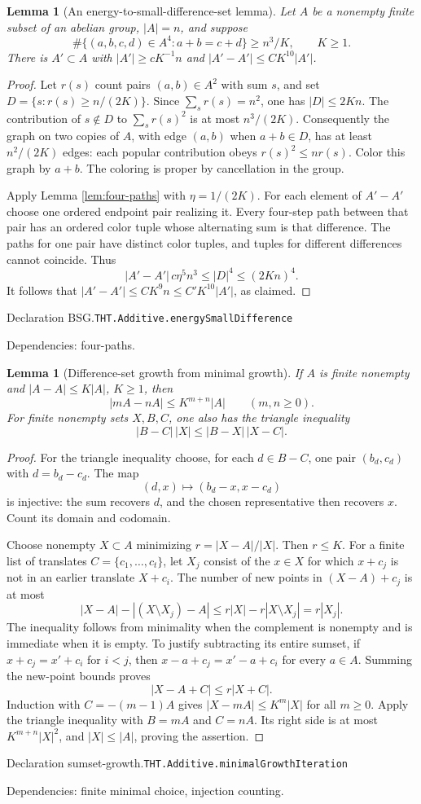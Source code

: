 \documentclass[11pt]{article}
\newtheorem{lemma}[theorem]{Lemma}
\theoremstyle{definition}
\numberwithin{equation}{section}
\newcommand{\bp}[3]{\par\smallskip\begingroup\footnotesize
\noindent\hypertarget{bp:#1}{\textsf{Declaration #1.}}\quad\nolinkurl{#2}\par
\noindent\textsf{Dependencies:} #3.\par\endgroup\smallskip}
\begin{document}
\begin{lemma}[An energy-to-small-difference-set lemma]\label{lem:BSG}
Let $A$ be a nonempty finite subset of an abelian group, $|A|=n$, and suppose
\[
 \#\{(a,b,c,d)\in A^4:a+b=c+d\}\ge n^3/K,\qquad K\ge1.
\]
There is $A'\subset A$ with $|A'|\ge cK^{-1}n$ and $|A'-A'|\le CK^{10}|A'|$.
\end{lemma}
\begin{proof}
Let $r(s)$ count pairs $(a,b)\in A^2$ with sum $s$, and set $D=\{s:r(s)\ge n/(2K)\}$. Since $\sum_s r(s)=n^2$, one has $|D|\le2Kn$. The contribution of $s\notin D$ to $\sum_s r(s)^2$ is at most $n^3/(2K)$. Consequently the graph on two copies of $A$, with edge $(a,b)$ when $a+b\in D$, has at least $n^2/(2K)$ edges: each popular contribution obeys $r(s)^2\le nr(s)$. Color this graph by $a+b$. The coloring is proper by cancellation in the group.

Apply Lemma \ref{lem:four-paths} with $\eta=1/(2K)$. For each element of $A'-A'$ choose one ordered endpoint pair realizing it. Every four-step path between that pair has an ordered color tuple whose alternating sum is that difference. The paths for one pair have distinct color tuples, and tuples for different differences cannot coincide. Thus
\[
 |A'-A'|\,c\eta^5n^3\le |D|^4\le(2Kn)^4.
\]
It follows that $|A'-A'|\le CK^9n\le C'K^{10}|A'|$, as claimed.
\end{proof}
\bp{BSG}{THT.Additive.energySmallDifference}{four-paths}

\begin{lemma}[Difference-set growth from minimal growth]\label{lem:sumset-growth}
If $A$ is finite nonempty and $|A-A|\le K|A|$, $K\ge1$, then
\[
 |mA-nA|\le K^{m+n}|A|\qquad(m,n\ge0).
\]
For finite nonempty sets $X,B,C$, one also has the triangle inequality
\[
 |B-C|\,|X|\le |B-X|\,|X-C|.
\]
\end{lemma}
\begin{proof}
For the triangle inequality choose, for each $d\in B-C$, one pair $(b_d,c_d)$ with $d=b_d-c_d$. The map
\[
 (d,x)\longmapsto(b_d-x,x-c_d)
\]
is injective: the sum recovers $d$, and the chosen representative then recovers $x$. Count its domain and codomain.

Choose nonempty $X\subset A$ minimizing $r=|X-A|/|X|$. Then $r\le K$. For a finite list of translates $C=\{c_1,\ldots,c_t\}$, let $X_j$ consist of the $x\in X$ for which $x+c_j$ is not in an earlier translate $X+c_i$. The number of new points in $(X-A)+c_j$ is at most
\[
 |X-A|-|(X\setminus X_j)-A|\le r|X|-r|X\setminus X_j|=r|X_j|.
\]
The inequality follows from minimality when the complement is nonempty and is immediate when it is empty. To justify subtracting its entire sumset, if $x+c_j=x'+c_i$ for $i<j$, then $x-a+c_j=x'-a+c_i$ for every $a\in A$. Summing the new-point bounds proves
\[
 |X-A+C|\le r|X+C|.
\]
Induction with $C=-(m-1)A$ gives $|X-mA|\le K^m|X|$ for all $m\ge0$. Apply the triangle inequality with $B=mA$ and $C=nA$. Its right side is at most $K^{m+n}|X|^2$, and $|X|\le|A|$, proving the assertion.
\end{proof}
\bp{sumset-growth}{THT.Additive.minimalGrowthIteration}{finite minimal choice, injection counting}
\end{document}
